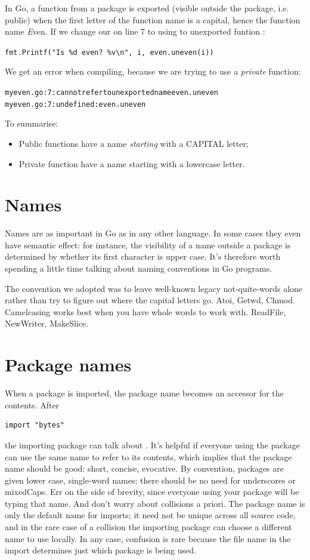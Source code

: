 In Go, a function from a package is exported (visible
outside the package, i.e. public) when the first letter of the function name is a capital, hence
the function name \emph{E}ven. If we change our  on line
7 to using to unexported funtion :

\noindent\lstinline{fmt.Printf("Is %d even? %v\n", i, even.uneven(i))}

\noindent We get an error when compiling, because we are trying to use a
\emph{private} function:
\begin{alltt}
myeven.go:7: cannot refer to unexported name even.uneven
myeven.go:7: undefined: even.uneven
\end{alltt}
To summarise:
\begin{itemize}
\item Public functions have a name \emph{starting} with a CAPITAL
letter;
\item Private function have a name starting with a lowercase letter.
\end{itemize}

\section{Names}
Names are as important in Go as in any other language. In some cases
they even have semantic effect: for instance, the visibility of a name
outside a package is determined by whether its first character is upper
case. It's therefore worth spending a little time talking about naming
conventions in Go programs.

The convention we adopted was to leave well-known legacy
not-quite-words alone rather than try to figure out where
the capital letters go.  Atoi, Getwd, Chmod.
Camelcasing works best when you have whole words
to work with.  ReadFile, NewWriter, MakeSlice.

\section{Package names}
When a package is imported, the package name becomes an accessor for the
contents. After
\begin{lstlisting}
import "bytes"
\end{lstlisting}
the importing package can talk about . It's helpful if
everyone using the package can use the same name to refer to its
contents, which implies that the package name should be good: short,
concise, evocative. By convention, packages are given lower case,
single-word names; there should be no need for underscores or mixedCaps.
Err on the side of brevity, since everyone using your package will be
typing that name. And don't worry about collisions a priori. The package
name is only the default name for imports; it need not be unique across
all source code, and in the rare case of a collision the importing
package can choose a different name to use locally. In any case,
confusion is rare because the file name in the import determines just
which package is being used.

